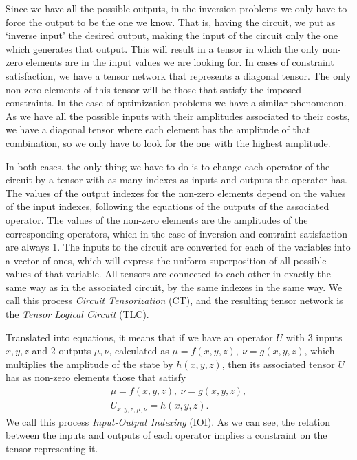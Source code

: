 Since we have all the possible outputs, in the inversion problems we only have to force the output to be the one we know. That is, having the circuit, we  put as `inverse input' the desired output, making the input of the circuit only the one which generates that output. This will result in a tensor in which the only non-zero elements are in the input values we are looking for. In cases of constraint satisfaction, we have a tensor network that represents a diagonal tensor. The only non-zero elements of this tensor will be those that satisfy the imposed constraints. In the case of optimization problems we have a similar phenomenon. As we have all the possible inputs with their amplitudes associated to their costs, we have a diagonal tensor where each element has the amplitude of that combination, so we only have to look for the one with the highest amplitude.

In both cases, the only thing we have to do is to change each operator of the circuit by a tensor with as many indexes as inputs and outputs the operator has. The values of the output indexes for the non-zero elements depend on the values of the input indexes, following the equations of the outputs of the associated operator. The values of the non-zero elements are the amplitudes of the corresponding operators, which in the case of inversion and contraint satisfaction are always 1. The inputs to the circuit are converted for each of the variables into a vector of ones, which will express the uniform superposition of all possible values of that variable. All tensors are connected to each other in exactly the same way as in the associated circuit, by the same indexes in the same way. We call this process \textit{Circuit Tensorization} (CT), and the resulting tensor network is the \textit{Tensor Logical Circuit} (TLC).

Translated into equations, it means that if we have an operator $U$ with 3 inputs $x,y,z$ and 2 outputs $\mu, \nu$, calculated as $\mu=f(x,y,z),\ \nu=g(x,y,z)$, which multiplies the amplitude of the state by $h(x,y,z)$, then its associated tensor $U$ has as non-zero elements those that satisfy
\begin{equation}
    \begin{gathered}
        \mu=f(x,y,z),\ \nu=g(x,y,z),\\
        U_{x,y,z,\mu,\nu}= h(x,y,z).
    \end{gathered}
\end{equation}
We call this process \textit{Input-Output Indexing} (IOI). As we can see, the relation between the inputs and outputs of each operator implies a constraint on the tensor representing it.

